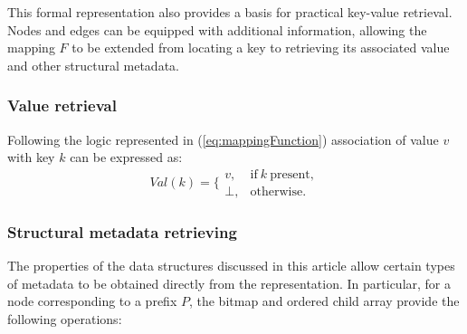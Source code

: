 \documentclass[11pt,twoside]{article}
\begin{document}
    This formal representation also provides a basis for practical key-value retrieval.
    Nodes and edges can be equipped with additional information, allowing the mapping $F$ to be extended
    from locating a key to retrieving its associated value and other structural metadata.

    \subsubsection{Value retrieval}\label{sec:value-retrieval}

    Following the logic represented in (\ref{eq:mappingFunction}) association of value $v$ with key $k$ can be
    expressed as:
    \begin{equation}
        Val(k)= \Biggl\{
        \begin{array}{ll}
            v, & \text{if}~k~\text{present},\\
            \bot, & \text{otherwise}.
        \end{array}\label{eq:mappingValue}
    \end{equation}

    \subsubsection{Structural metadata retrieving}\label{sec:meta-retrieving}
    The properties of the data structures discussed in this article allow certain types of
    metadata to be obtained directly from the representation. In particular, for a node corresponding
    to a prefix $P$, the bitmap and ordered child array provide the following operations:
\end{document}
